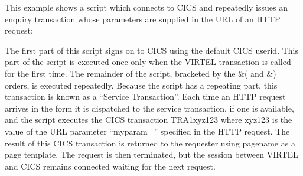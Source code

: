 \documentclass[letterpaper,10pt,english]{sphinxmanual}
\begin{document}

This example shows a script which connects to CICS and repeatedly issues an enquiry transaction whose parameters are supplied in the URL of an HTTP request:

\begin{sphinxVerbatim}[commandchars=\\\{\}]
                          
                         
      
                      
                          
                                 
     
         
\end{sphinxVerbatim}


The first part of this script signs on to CICS using the default CICS userid. This part of the script is executed once only when the VIRTEL transaction is called for the first time. The remainder of the script, bracketed by the \&( and \&) orders, is executed repeatedly. Because the script has a repeating part, this transaction is known as a “Service Transaction”. Each time an HTTP request arrives in the form  it is dispatched to the service transaction, if one is available, and the script executes the CICS transaction TRA1xyz123 where xyz123 is the value of the URL parameter “myparam=” specified in the HTTP request. The result of this CICS transaction is returned to the requester using pagename as a page template. The request is then terminated, but the session between VIRTEL and CICS remains connected waiting for the next request.
\end{document}
